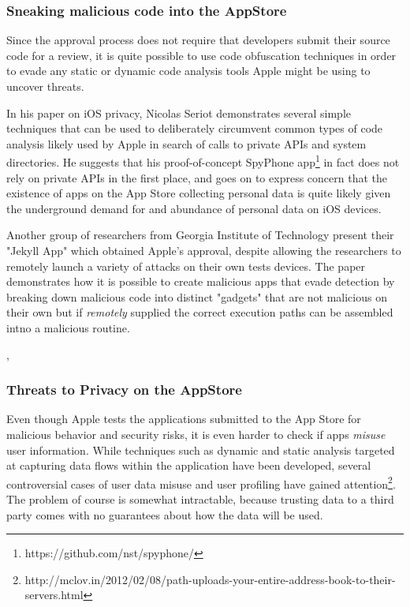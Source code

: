 \documentclass[12pt, titlepage, oneside]{amsart}
\begin{document}
\subsubsection{Sneaking malicious code into the AppStore}
Since the approval process does not require that developers submit their source code for a review, it is quite possible to use code obfuscation techniques in order to evade any static or dynamic code analysis tools Apple might be using to uncover threats. 

In his paper on iOS privacy\cite{priv}, Nicolas Seriot demonstrates several simple techniques that can be used to deliberately circumvent common types of code analysis likely used by Apple in search of calls to private APIs and system directories. He suggests that his proof-of-concept SpyPhone app\footnote{https://github.com/nst/spyphone/} in fact does not rely on private APIs in the first place, and goes on to express concern that the existence of apps on the App Store collecting personal data is quite likely given the underground demand for and abundance of personal data on iOS devices.

Another group of researchers from Georgia Institute of Technology present\cite{jekyll} their "Jekyll App" which obtained Apple's approval, despite allowing the researchers to remotely launch a variety of attacks on their own tests devices. The paper demonstrates how it is possible to create malicious apps that evade detection by breaking down malicious code into distinct "gadgets" that are not malicious on their own but if  \emph{remotely} supplied the correct execution paths can be assembled intno a malicious routine. 

\cite{attacks}, 
\subsubsection{Threats to Privacy on the AppStore}
Even though Apple tests the applications submitted to the App Store for malicious behavior and security risks, it is even harder to check if apps \emph{misuse} user information. While techniques such as dynamic \cite{dynamic} and static \cite{pios} analysis targeted at capturing data flows within the application have been developed, several controversial cases of user data misuse and user profiling have gained attention\footnote{http://mclov.in/2012/02/08/path-uploads-your-entire-address-book-to-their-servers.html}. The problem of course is somewhat intractable, because trusting data to a third party comes with no guarantees about how the data will be used. 
\end{document}
